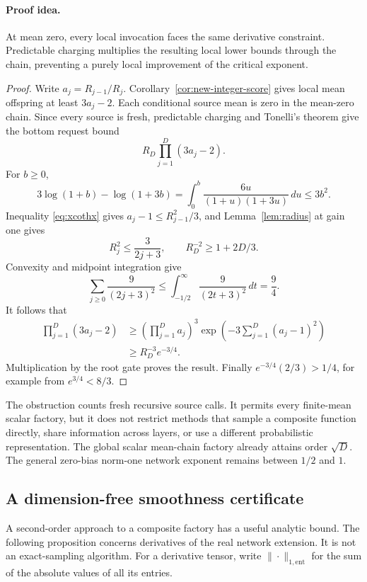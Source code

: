 \paragraph{Proof idea.}
At mean zero, every local invocation faces the same derivative constraint.
Predictable charging multiplies the resulting local lower bounds through the
chain, preventing a purely local improvement of the critical exponent.

\begin{proof}
Write $a_j=R_{j-1}/R_j$.  Corollary~\ref{cor:new-integer-score}
gives local mean offspring at least $3a_j-2$.  Each conditional
source mean is zero in the mean-zero chain.  Since every source is
fresh, predictable charging and Tonelli's theorem give the bottom
request bound
\[
 R_D\prod_{j=1}^D(3a_j-2).
\]
For $b\ge0$,
\[
 3\log(1+b)-\log(1+3b)
 =\int_0^b\frac{6u}{(1+u)(1+3u)}\,du\le3b^2.
\]
Inequality \eqref{eq:xcothx} gives
$a_j-1\le R_{j-1}^2/3$, and Lemma~\ref{lem:radius} at gain one gives
\[
 R_j^2\le\frac3{2j+3},\qquad R_D^{-2}\ge1+2D/3.
\]
Convexity and midpoint integration give
\[
 \sum_{j\ge0}\frac9{(2j+3)^2}
 \le\int_{-1/2}^{\infty}\frac9{(2t+3)^2}\,dt=\frac94.
\]
It follows that
\begin{align*}
 \prod_{j=1}^D(3a_j-2)
 &\ge\left(\prod_{j=1}^D a_j\right)^3
     \exp\left(-3\sum_{j=1}^D(a_j-1)^2\right)\\
 &\ge R_D^{-3}e^{-3/4}.
\end{align*}
Multiplication by the root gate proves the result.  Finally
$e^{-3/4}(2/3)>1/4$, for example from $e^{3/4}<8/3$.
\end{proof}

The obstruction counts fresh recursive source calls.  It permits every
finite-mean scalar factory, but it does not restrict methods that sample
a composite function directly, share information across layers, or use a
different probabilistic representation.  The global scalar mean-chain
factory already attains order $\sqrt D$.  The general zero-bias
norm-one network exponent remains between $1/2$ and $1$.

\subsection{A dimension-free smoothness certificate}
\label{sec:new-critical-smoothness}

A second-order approach to a composite factory has a useful analytic
bound.  The following proposition concerns derivatives of the real
network extension.  It is not an exact-sampling algorithm.
For a derivative tensor, write $\|\cdot\|_{1,\mathrm{ent}}$ for the
sum of the absolute values of all its entries.

